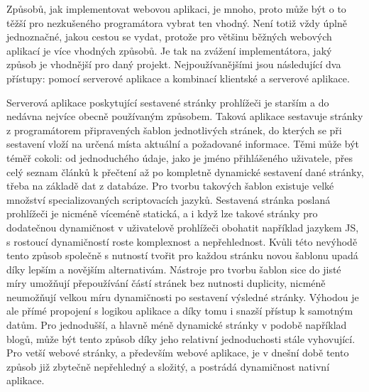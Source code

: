 	Způsobů, jak implementovat webovou aplikaci, je mnoho, proto může být o to těžší pro nezkušeného programátora vybrat ten vhodný.
	Není totiž vždy úplně jednoznačné, jakou cestou se vydat, protože pro většinu běžných webových aplikací je více
	vhodných způsobů.
	Je tak na zvážení implementátora, jaký způsob je vhodnější pro daný projekt.
	Nejpoužívanějšími jsou následující dva přístupy: pomocí serverové aplikace a kombinací klientské a serverové aplikace.

	Serverová aplikace poskytující sestavené stránky prohlížeči je starším a do nedávna nejvíce obecně používaným způsobem.
	Taková aplikace sestavuje stránky z programátorem připravených šablon jednotlivých stránek, do kterých se při sestavení
	vloží na určená místa aktuální a požadované informace.
	Těmi může být téměř cokoli: od jednoduchého údaje, jako je jméno přihlášeného uživatele, přes celý seznam článků k přečtení
	až po kompletně dynamické sestavení dané stránky, třeba na základě dat z databáze.
	Pro tvorbu takových šablon existuje velké množství specializovaných scriptovacích jazyků.
	Sestavená stránka poslaná prohlížeči je nicméně víceméně statická, a i když lze takové stránky pro dodatečnou
	dynamičnost v uživatelově prohlížeči obohatit například jazykem \ac{JS}, s rostoucí dynamičností roste komplexnost a nepřehlednost.
	Kvůli této nevýhodě tento způsob společně s nutností tvořit pro každou stránku novou šablonu upadá díky lepším a novějším
	alternativám.
	Nástroje pro tvorbu šablon sice do jisté míry umožňují přepoužívání částí stránek bez nutnosti duplicity,
	nicméně neumožňují velkou míru dynamičnosti po sestavení výsledné stránky.
	Výhodou je ale přímé propojení s logikou aplikace a díky tomu i snazší přístup k samotným datům.
	Pro jednodušší, a hlavně méně dynamické stránky v podobě například blogů, může být tento způsob díky jeho
	relativní jednoduchosti stále vyhovující.
	Pro vetší webové stránky, a především webové aplikace, je v dnešní době tento způsob již zbytečně nepřehledný a složitý, a
	postrádá dynamičnost nativní aplikace.

